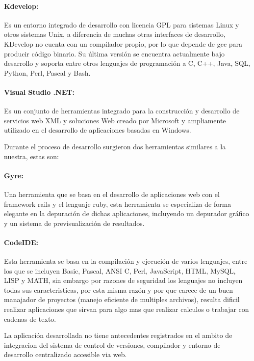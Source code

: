 \paragraph{Kdevelop: \cite{kdevelop}} Es un entorno integrado de desarrollo con licencia GPL para sistemas Linux y otros sistemas Unix, a diferencia de muchas otras interfaces de desarrollo, KDevelop no cuenta con un compilador propio, por lo que depende de gcc para producir código binario. Su última versión se encuentra actualmente bajo desarrollo y soporta entre otros lenguajes de programación a C, C++, Java, SQL, Python, Perl, Pascal y Bash.

\paragraph{Visual Studio .NET: \cite{visual_studio}} Es un conjunto de herramientas integrado para la construcción y desarrollo de servicios web XML y soluciones Web creado por Microsoft y ampliamente utilizado en el desarrollo de aplicaciones basadas en Windows.


Durante el proceso de desarrollo surgieron dos herramientas similares a la nuestra, estas son:


\paragraph{Gyre:\cite{gyre}} Una herramienta que se basa en el desarrollo de aplicaciones web con el framework rails y el lenguaje ruby, esta herramienta se especializa de forma elegante en la depuración de dichas aplicaciones, incluyendo un depurador gráfico y un sistema de previsualización de resultados.

\paragraph{CodeIDE:\cite{codeide}} Esta herramienta se basa en la compilación y ejecución de varios lenguajes, entre los que se incluyen Basic, Pascal, ANSI C, Perl, JavaScript, HTML, MySQL, LISP y MATH, sin embargo por razones de seguridad los lenguajes no incluyen todas sus caracteristicas, por esta misma razón y por que carece de un buen manajador de proyectos (manejo eficiente de multiples archivos), resulta dificil realizar aplicaciones que sirvan para algo mas que realizar calculos o trabajar con cadenas de texto.


La aplicación desarrollada no tiene antecedentes registrados en el ambito de integracion del sistema de control de versiones, compilador y entorno de desarrollo centralizado accesible via web.
